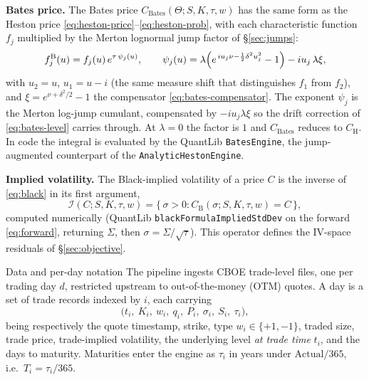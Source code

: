 \documentclass[a4paper, 11pt, reqno]{amsart}
\makeatletter
\def\section{\@startsection{section}{1}%
  \z@{.7\linespacing\@plus\linespacing}{.5\linespacing}%
  {\normalfont\bfseries\centering}}
\makeatother
\begin{document}
			\textbf{Bates price.} The Bates price $C_{\mathrm{Bates}}(\Theta; S,K,\tau,w)$ has the same form
			as the Heston price \eqref{eq:heston-price}--\eqref{eq:heston-prob}, with each characteristic
			function $f_j$ multiplied by the Merton lognormal jump factor of \S\ref{sec:jumps}:
			\begin{equation}\label{eq:bates-cf}
				f_j^{\mathrm{B}}(u) = f_j(u)\,e^{\tau\,\psi_j(u)}, \qquad
				\psi_j(u) = \lambda\Bigl( e^{\,i u_j \nu - \frac12 \delta^2 u_j^2} - 1 \Bigr) - i u_j\,\lambda\xi,
			\end{equation}
			with $u_2 = u$, $u_1 = u - i$ (the same measure shift that distinguishes $f_1$ from $f_2$), and
			$\xi = e^{\nu + \delta^2/2} - 1$ the compensator \eqref{eq:bates-compensator}. The exponent $\psi_j$
			is the Merton log-jump cumulant, compensated by $-i u_j \lambda\xi$ so the drift correction of
			\eqref{eq:bates-level} carries through. At $\lambda=0$ the factor is $1$ and $C_{\mathrm{Bates}}$
			reduces to $C_{\mathrm{H}}$. In code the integral is evaluated by the QuantLib \texttt{BatesEngine},
			the jump-augmented counterpart of the \texttt{AnalyticHestonEngine}.
		
			\textbf{Implied volatility.} The Black-implied volatility of a price $C$ is the inverse
			of \eqref{eq:black} in its first argument,
			\begin{equation}\label{eq:ivinv}
				\mathcal{I}(C; S,K,\tau,w)
				= \bigl\{\, \sigma>0 : C_{\mathrm{B}}(\sigma; S,K,\tau,w) = C \,\bigr\},
			\end{equation}
			computed numerically (QuantLib \texttt{blackFormulaImpliedStdDev} on the forward
			\eqref{eq:forward}, returning $\Sigma$, then $\sigma=\Sigma/\sqrt{\tau}$). This operator
			defines the IV-space residuals of \S\ref{sec:objective}.
	
	\section{Data and per-day notation}\label{sec:data}
		The pipeline ingests CBOE trade-level files, one per trading day $d$, restricted upstream
		to out-of-the-money (OTM) quotes. A day is a set of trade records indexed by $i$, each
		carrying
		\begin{equation}
			\bigl(t_i,\ K_i,\ w_i,\ q_i,\ P_i,\ \sigma_i,\ S_i,\ \tau_i\bigr),
		\end{equation}
		being respectively the quote timestamp, strike, type $w_i\in\{+1,-1\}$, traded size, trade
		price, trade-implied volatility, the underlying level \emph{at trade time} $t_i$, and the
		days to maturity. Maturities enter the engine as $\tau_i$ in years under
		$\mathrm{Actual}/365$, i.e.\ $T_i = \tau_i/365$.
	
\end{document}
